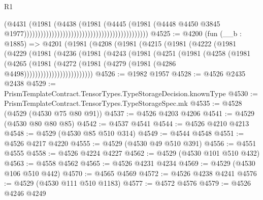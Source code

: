 \begin{lexlean}{R1}
\begin{coremodule}
                                                                                (@4431
                                                                                  (@1981
                                                                                    (@4438
                                                                                      (@1981
                                                                                        (@4445
                                                                                          (@1981
                                                                                            (@4448
                                                                                              @4450
                                                                                              @3845
                                                                                              @1977)))))))))))))))))))))))))))))))))))))))))))))
@4525 := @4200
    (fun (__b : @1885) =>
    @4201
      (@1981
        (@4208
          (@1981
            (@4215
              (@1981
                (@4222
                  (@1981
                    (@4229
                      (@1981
                        (@4236
                          (@1981
                            (@4243
                              (@1981
                                (@4251
                                  (@1981
                                    (@4258
                                      (@1981
                                        (@4265
                                          (@1981
                                            (@4272
                                              (@1981
                                                (@4279 (@1981 (@4286 @4498)))))))))))))))))))))))))
@4526 := @1982 @1957
@4528 := @4526 @2435 @2438
@4529 := PrismTemplateContract.TensorTypes.TypeStorageDecision.knownType
@4530 := PrismTemplateContract.TensorTypes.TypeStorageSpec.mk
@4535 := @4528 (@4529 (@4530 @75 @80 @91))
@4537 := @4526 @4203 @4206
@4541 := @4529 (@4530 @80 @80 @85)
@4542 := @4537 @4541
@4544 := @4526 @4210 @4213
@4548 := @4529 (@4530 @85 @510 @314)
@4549 := @4544 @4548
@4551 := @4526 @4217 @4220
@4555 := @4529 (@4530 @49 @510 @391)
@4556 := @4551 @4555
@4558 := @4526 @4224 @4227
@4562 := @4529 (@4530 @101 @510 @432)
@4563 := @4558 @4562
@4565 := @4526 @4231 @4234
@4569 := @4529 (@4530 @106 @510 @442)
@4570 := @4565 @4569
@4572 := @4526 @4238 @4241
@4576 := @4529 (@4530 @111 @510 @1183)
@4577 := @4572 @4576
@4579 := @4526 @4246 @4249

\end{coremodule}
\end{lexlean}
